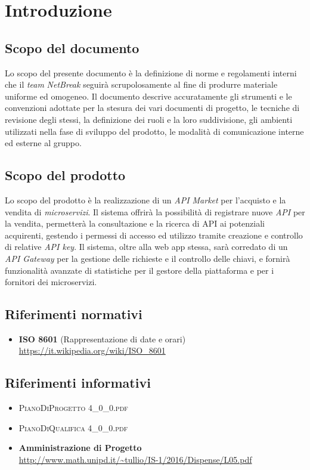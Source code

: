 \newpage
\section{Introduzione}

\subsection{Scopo del documento}
Lo scopo del presente documento è la definizione di norme e regolamenti interni che il \textit{team} \textit{NetBreak} seguirà scrupolosamente al fine di produrre materiale uniforme ed omogeneo. Il documento descrive accuratamente gli strumenti e le convenzioni adottate per la stesura dei vari documenti di progetto, le tecniche di revisione degli stessi, la definizione dei ruoli e la loro suddivisione, gli ambienti utilizzati nella fase di sviluppo del prodotto, le modalità di comunicazione interne ed esterne al gruppo.

\subsection{Scopo del prodotto}
Lo scopo del prodotto è la realizzazione di un \textit{API Market} per l'acquisto e la vendita di \textit{microservizi}. Il sistema offrirà la possibilità di registrare nuove \textit{API} per la vendita, permetterà la consultazione e la ricerca di API ai potenziali acquirenti, gestendo i permessi di accesso ed utilizzo tramite creazione e controllo di relative \textit{API key}. Il sistema, oltre alla web app stessa, sarà corredato di un \textit{API Gateway} per la gestione delle richieste e il controllo delle chiavi, e fornirà funzionalità avanzate di statistiche per il gestore della piattaforma e per i fornitori dei microservizi.

\subsection{Riferimenti normativi}
\begin{itemize}
	\item \textbf{ISO 8601} (Rappresentazione di date e orari)\\
	\url{https://it.wikipedia.org/wiki/ISO\_8601}
\end{itemize}

\subsection{Riferimenti informativi}
\begin{itemize}
	\item \textsc{PianoDiProgetto 4\_0\_0.pdf}
	\item \textsc{PianoDiQualifica 4\_0\_0.pdf}
	\item \textbf{Amministrazione di Progetto}\\
	\url{http://www.math.unipd.it/~tullio/IS-1/2016/Dispense/L05.pdf}
\end{itemize}

